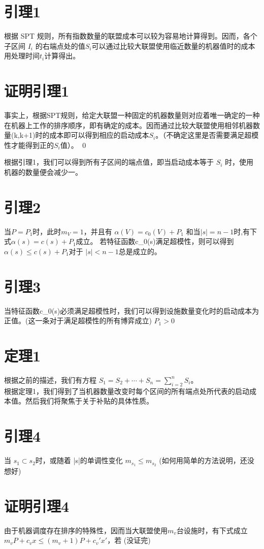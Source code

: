 \documentclass[UTF8]{article}
\begin{document}
\section*{引理1}
根据 SPT 规则，所有指数数量的联盟成本可以较为容易地计算得到。因而，各个子区间 $I_i$ 的右端点处的值$S_i$可以通过比较大联盟使用临近数量的机器值时的成本用处理时间$t_i$计算得出。

\section*{证明引理1}
事实上，根据SPT规则，给定大联盟一种固定的机器数量则对应着唯一确定的一种在机器上工作的排序顺序，即有确定的成本。因而通过比较大联盟使用相邻机器数量(k,k+1)时的成本即可以得到相应的启动成本$S_i$。（不确定这里是否需要满足超模性才能得到正的$S_i$值）。
\qed

根据引理1，我们可以得到所有子区间的端点值，即当启动成本等于 $S_i$ 时，使用机器的数量便会减少一。

\section*{引理2}
当$P=P_1$时，此时$m_V=1$，并且有 $\alpha(V)=c_0(V)+P_1$ 和当$\left| s \right|= n-1$时,有下式$\alpha(s)=c(s)+P_1$成立。
若特征函数c_0(s)满足超模性，则可以得到$\alpha(s) \leq c(s)+P_1$对于 $\left| s \right| < n-1 $总是成立的。

\section*{引理3}
当特征函数c_0(s)必须满足超模性时，我们可以得到设施数量变化时的启动成本为正值。(这一条对于满足超模性的所有博弈成立)
$P_1 > 0$

\section*{定理1}
根据之前的描述，我们有方程
$S_{1}=S_{2}+\cdots+S_{n}=\sum_{i=2}^n S_i$。\\
根据定理1，我们得到了当机器数量改变时每个区间的所有端点处所代表的启动成本值。然后我们将聚焦于关于补贴的具体性质。

\section*{引理4}
当 $s_1 \subset s_2$时，或随着 |s|的单调性变化
$m_{s_1} \leq m_{s_2}$ (如何用简单的方法说明，还没想好)


\section*{证明引理4}
由于机器调度存在排序的特殊性，因而当大联盟使用$m_v$台设施时，有下式成立$m_vP+c_vx \leq (m_v+1)P+c_v'x'$，若
(没证完)
\end{document}
